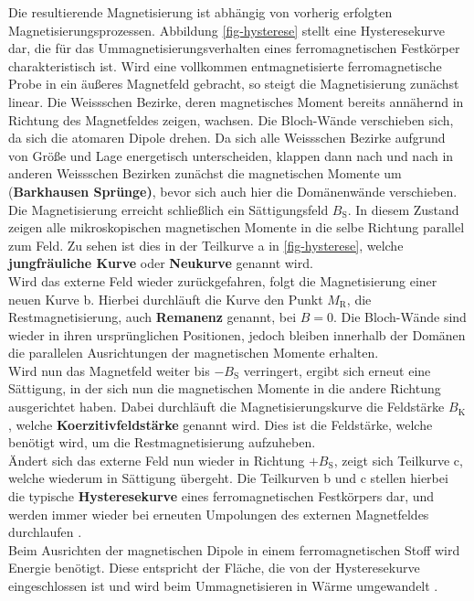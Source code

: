\documentclass[page,pdftex,12pt,a4paper,twoside,openright]{scrbook}
\begin{document}
Die resultierende Magnetisierung ist abhängig von vorherig erfolgten Magnetisierungsprozessen. Abbildung \ref{fig-hysterese} stellt eine Hysteresekurve dar, die für das Ummagnetisierungsverhalten eines ferromagnetischen Festkörper charakteristisch ist. Wird eine vollkommen entmagnetisierte ferromagnetische Probe in ein äußeres Magnetfeld gebracht, so steigt die Magnetisierung zunächst linear. Die Weissschen Bezirke, deren magnetisches Moment bereits annähernd in Richtung des Magnetfeldes zeigen, wachsen. Die Bloch-Wände verschieben sich, da sich die atomaren Dipole drehen. Da sich alle Weissschen Bezirke aufgrund von Größe und Lage energetisch unterscheiden, klappen dann nach und nach in anderen Weissschen Bezirken zunächst die magnetischen Momente um (\textbf{Barkhausen Sprünge)}, bevor sich auch hier die Domänenwände verschieben.\\
Die Magnetisierung erreicht schließlich ein Sättigungsfeld \(B_\mathrm{S}\). In diesem Zustand zeigen alle mikroskopischen magnetischen Momente in die selbe Richtung parallel zum Feld. Zu sehen ist dies in der Teilkurve a in \ref{fig-hysterese}, welche \textbf{jungfräuliche Kurve} oder \textbf{Neukurve} genannt wird.\\
Wird das externe Feld wieder zurückgefahren, folgt die Magnetisierung einer neuen Kurve b. Hierbei durchläuft die Kurve den Punkt \(M_\mathrm{R}\), die Restmagnetisierung, auch \textbf{Remanenz} genannt, bei \(B=0\). Die Bloch-Wände sind wieder in ihren ursprünglichen Positionen, jedoch bleiben innerhalb der Domänen die parallelen Ausrichtungen der magnetischen Momente erhalten.\\
Wird nun das Magnetfeld weiter bis \(-B_\mathrm{S}\) verringert, ergibt sich erneut eine Sättigung, in der sich nun die magnetischen Momente in die andere Richtung ausgerichtet haben. Dabei durchläuft die Magnetisierungskurve die Feldstärke \(B_\mathrm{K}\), welche \textbf{Koerzitivfeldstärke} genannt wird. Dies ist die Feldstärke, welche benötigt wird, um die Restmagnetisierung aufzuheben.\\
Ändert sich das externe Feld nun wieder in Richtung \(+B_\mathrm{S}\), zeigt sich Teilkurve c, welche wiederum in Sättigung übergeht. Die Teilkurven b und c stellen hierbei die typische \textbf{Hysteresekurve} eines ferromagnetischen Festkörpers dar, und werden immer wieder bei erneuten Umpolungen des externen Magnetfeldes durchlaufen \cite{rybach_physik_2008,demtroder_experimentalphysik_2017}.\\

Beim Ausrichten der magnetischen Dipole in einem ferromagnetischen Stoff wird Energie benötigt. Diese entspricht der Fläche, die von der Hysteresekurve eingeschlossen ist und wird beim Ummagnetisieren in Wärme umgewandelt \cite{rybach_physik_2008}.\\
\end{document}
